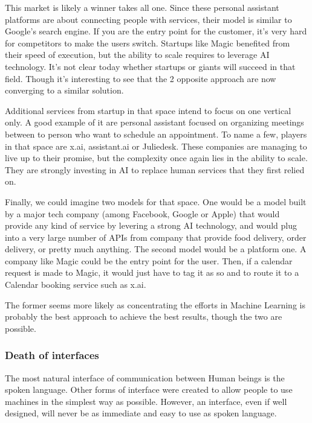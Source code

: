 \documentclass[12pt]{article}
\begin{document}
This market is likely a winner takes all one. Since these personal assistant
platforms are about connecting people with services, their model is similar to
Google's search engine. If you are the entry point for the customer, it's very
hard for competitors to make the users switch. Startups like Magic benefited
from their speed of execution, but the ability to scale requires to leverage AI
technology. It's not clear today whether startups or giants will succeed in that
field. Though it's interesting to see that the 2 opposite approach are now converging
to a similar solution.

Additional services from startup in that space intend to focus on one vertical
only. A good example of it are personal assistant focused on organizing meetings
between to person who want to schedule an appointment. To name a few, players in
that space are x.ai, assistant.ai or Juliedesk. These companies are managing to
live up to their promise, but the complexity once again lies in the ability to
scale. They are strongly investing in AI to replace human services that they
first relied on.

Finally, we could imagine two models for that space.
One would be a model built by a major tech company (among Facebook, Google or
Apple) that would provide any kind of service by levering a strong AI
technology, and would plug into a very large number of APIs from company that
provide food delivery, order delivery, or pretty much anything.
The second model would be a platform one. A company like Magic could be the
entry point for the user. Then, if a calendar request is made to Magic, it would
just have to tag it as so and to route it to a Calendar booking service such as
x.ai.

The former seems more likely as concentrating the efforts in Machine Learning is
probably the best approach to achieve the best results, though the two are
possible.

\subsubsection{Death of interfaces}

The most natural interface of communication between Human beings is the spoken language.
Other forms of interface were created to allow people to use machines in the simplest way as
possible. However, an interface, even if well designed, will never be as immediate and
easy to use as spoken language.
\end{document}
